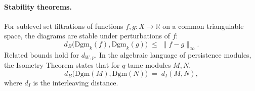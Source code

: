 \paragraph{Stability theorems.}
For sublevel set filtrations of functions $f,g:X\to\mathbb{R}$ on a common triangulable space, the diagrams are stable under perturbations of $f$:
\begin{equation}
d_B\big(\mathrm{Dgm}_k(f), \mathrm{Dgm}_k(g)\big) \;\le\; \lVert f-g \rVert_{\infty}.
\end{equation}
Related bounds hold for $d_{W,p}$. In the algebraic language of persistence modules, the Isometry Theorem states that for $q$-tame modules $M,N$,
\begin{equation}
d_B\big(\mathrm{Dgm}(M), \mathrm{Dgm}(N)\big) \;=\; d_I(M,N),
\end{equation}
where $d_I$ is the interleaving distance.


